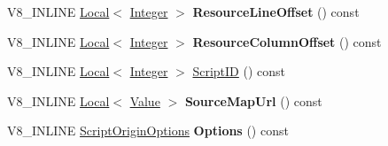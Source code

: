 \begin{DoxyCompactItemize}
\item 
V8\+\_\+\+I\+N\+L\+I\+NE \hyperlink{classv8_1_1_local}{Local}$<$ \hyperlink{classv8_1_1_integer}{Integer} $>$ {\bfseries Resource\+Line\+Offset} () const \hypertarget{classv8_1_1_script_origin_a1359d207f074c949a345a3daddc34c58}{}\label{classv8_1_1_script_origin_a1359d207f074c949a345a3daddc34c58}

\item 
V8\+\_\+\+I\+N\+L\+I\+NE \hyperlink{classv8_1_1_local}{Local}$<$ \hyperlink{classv8_1_1_integer}{Integer} $>$ {\bfseries Resource\+Column\+Offset} () const \hypertarget{classv8_1_1_script_origin_ab0c1ca158a1c2aa554c746b472bd30f0}{}\label{classv8_1_1_script_origin_ab0c1ca158a1c2aa554c746b472bd30f0}

\item 
V8\+\_\+\+I\+N\+L\+I\+NE \hyperlink{classv8_1_1_local}{Local}$<$ \hyperlink{classv8_1_1_integer}{Integer} $>$ \hyperlink{classv8_1_1_script_origin_ab73721102b23fb7e6f1c5aee833bbd5f}{Script\+ID} () const 
\item 
V8\+\_\+\+I\+N\+L\+I\+NE \hyperlink{classv8_1_1_local}{Local}$<$ \hyperlink{classv8_1_1_value}{Value} $>$ {\bfseries Source\+Map\+Url} () const \hypertarget{classv8_1_1_script_origin_a72c5225f4816b16dab7aa0370b5511ee}{}\label{classv8_1_1_script_origin_a72c5225f4816b16dab7aa0370b5511ee}

\item 
V8\+\_\+\+I\+N\+L\+I\+NE \hyperlink{classv8_1_1_script_origin_options}{Script\+Origin\+Options} {\bfseries Options} () const \hypertarget{classv8_1_1_script_origin_aa0eca1567b9ecd08a4c34957cf0a3dde}{}\label{classv8_1_1_script_origin_aa0eca1567b9ecd08a4c34957cf0a3dde}

\end{DoxyCompactItemize}
